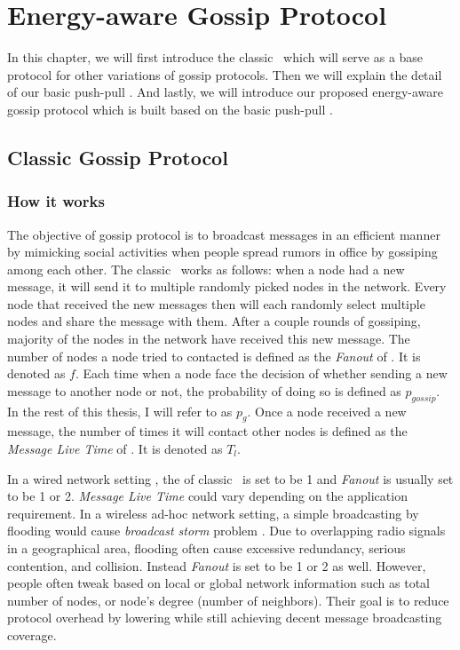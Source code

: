 \chapter{Energy-aware Gossip Protocol}
\label{Chapter3}

In this chapter, we will first introduce the classic \gp ~which will serve as a base protocol for other variations of gossip protocols. Then we will explain the detail of our basic push-pull \gp. And lastly, we will introduce our proposed energy-aware gossip protocol which is built based on the basic push-pull \gp.

\section{Classic Gossip Protocol}
\subsection{How it works}

The objective of gossip protocol is to broadcast messages in an efficient manner by mimicking social activities when people spread rumors in office by gossiping among each other. The classic \gp ~works as follows: when a node had a new message, it will send it to multiple randomly picked nodes in the network. Every node that received the new messages then will each randomly select multiple nodes and share the message with them. After a couple rounds of gossiping, majority of the nodes in the network have received this new message. The number of nodes a node tried to contacted is defined as the \emph{Fanout} of \gp. It is denoted as $f$. Each time when a node face the decision of whether sending a new message to another node or not, the probability of doing so is defined as $p_{gossip}$. In the rest of this thesis, I will refer to \emph{\pog} as $p_g$. Once a node received a new message, the number of times it will contact other nodes is defined as the \emph{Message Live Time} of \gp. It is denoted as $T_l$.

In a wired network setting , the \emph{\pog} of classic \gp ~is set to be 1 and \emph{Fanout} is usually set to be 1 or 2. \emph{Message Live Time} could vary depending on the application requirement. In a wireless ad-hoc network setting, a simple broadcasting by flooding would cause \emph{broadcast storm} problem \cite{tseng2002broadcast}. Due to overlapping radio signals in a geographical area, flooding often cause excessive redundancy, serious contention, and collision. Instead \emph{Fanout} is set to be 1 or 2 as well. However, people often tweak \emph{\pog} based on local or global network information such as total number of nodes, or node's degree (number of neighbors). Their goal is to reduce protocol overhead by lowering \emph{\pog} while still achieving decent message broadcasting coverage. 

